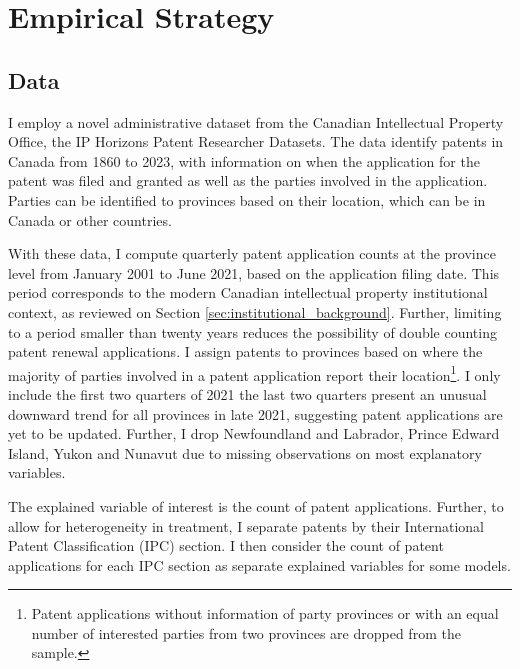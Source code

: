 \documentclass[../main.tex]{subfiles}
\begin{document}
\section{Empirical Strategy}
\label{sec:empirical_strategy}

\subsection{Data}

I employ a novel administrative dataset from the Canadian Intellectual Property Office, the IP Horizons Patent Researcher Datasets\nocite{canadianintellectualpropertyoffice23}. The data identify patents in Canada from 1860 to 2023, with information on when the application for the patent was filed and granted as well as the parties involved in the application. Parties can be identified to provinces based on their location, which can be in Canada or other countries. 


With these data, I compute quarterly patent application counts at the province level from January 2001 to June 2021, based on the application filing date. This period corresponds to the modern Canadian intellectual property institutional context, as reviewed on Section \ref{sec:institutional_background}. Further, limiting to a period smaller than twenty years reduces the possibility of double counting patent renewal applications. I assign patents to provinces based on where the majority of parties involved in a patent application report their location\footnote{Patent applications without information of party provinces or with an equal number of interested parties from two provinces are dropped from the sample.}. I only include the first two quarters of 2021 the last two quarters present an unusual downward trend for all provinces in late 2021, suggesting patent applications are yet to be updated. Further, I drop Newfoundland and Labrador, Prince Edward Island, Yukon and Nunavut due to missing observations on most explanatory variables. 


The explained variable of interest is the count of patent applications. Further, to allow for heterogeneity in treatment, I separate patents by their International Patent Classification (IPC) section. I then consider the count of patent applications for each IPC section as separate explained variables for some models.
\end{document}
